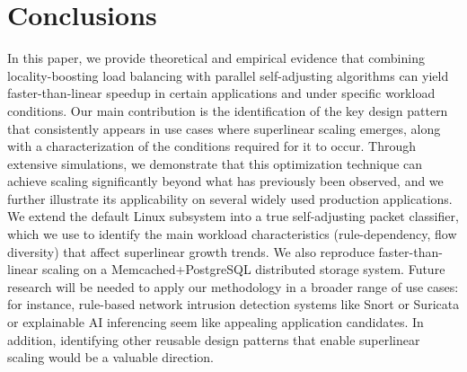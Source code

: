 \section{Conclusions}\label{sec:conclusions}

In this paper, we provide theoretical and empirical evidence that combining locality-boosting load balancing with parallel self-adjusting algorithms can yield faster-than-linear speedup in certain applications and under specific workload conditions. Our main contribution is the identification of the key design pattern that consistently appears in use cases where superlinear scaling emerges, along with a characterization of the conditions required for it to occur. Through extensive simulations, we demonstrate that this optimization technique can achieve scaling significantly beyond what has previously been observed, and we further illustrate its applicability on several widely used production applications. We extend the default \nftables Linux subsystem into a true self-adjusting packet classifier, which we use to identify the main workload characteristics (rule-dependency, flow diversity) that affect superlinear growth trends.  We also reproduce faster-than-linear scaling on a Memcached+PostgreSQL distributed storage system. Future research will be needed to apply our methodology in a broader range of use cases: for instance, rule-based network intrusion detection systems like Snort or Suricata \cite{10.5555/2537857.2537883} or explainable AI inferencing seem like appealing application candidates. In addition, identifying other reusable design patterns that enable superlinear scaling would be a valuable direction.



